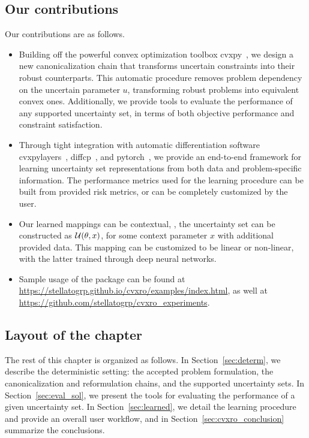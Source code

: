 \subsection{Our contributions}%
\label{c6:sub:our_contributions}
Our contributions are as follows.
\begin{itemize}
  \item Building off the powerful convex optimization toolbox cvxpy~\cite{diamond2016cvxpy}, we design a new canonicalization chain that transforms uncertain constraints into their robust counterparts. This automatic procedure removes problem dependency on the uncertain parameter $u$, transforming robust problems into equivalent convex ones. Additionally, we provide tools to evaluate the performance of any supported uncertainty set, in terms of both objective performance and constraint satisfaction. 
\item Through tight integration with automatic differentiation software cvxpylayers~\cite{cvxpylayers2019}, diffcp~\cite{diffcp2019}, and pytorch~\cite{paszke2019pytorch}, we provide an end-to-end framework for learning uncertainty set representations from both data and problem-specific information. The performance metrics used for the learning procedure can be built from provided risk metrics, or can be completely customized by the user. 
\item Our learned mappings can be contextual, \ie, the uncertainty set can be constructed as $\mathcal{U}(\theta,x)$, for some context parameter $x$ with additional provided data. This mapping can be customized to be linear or non-linear, with the latter trained through deep neural networks. 
  \item Sample usage of the package can be found at \url{https://stellatogrp.github.io/cvxro/examples/index.html}, as well at \url{https://github.com/stellatogrp/cvxro_experiments}.
\end{itemize}

\subsection{Layout of the chapter}%
The rest of this chapter is organized as follows.
In Section~\ref{sec:determ}, we describe the deterministic setting: the accepted problem formulation, the canonicalization and reformulation chains, and the supported uncertainty sets.
In Section~\ref{sec:eval_sol}, we present the tools for evaluating the performance of a given uncertainty set.
In Section~\ref{sec:learned}, we detail the learning procedure and provide an overall user workflow, and in Section~\ref{sec:cvxro_conclusion} summarize the conclusions. 

